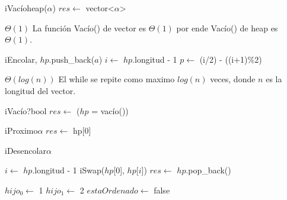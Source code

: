 \begin{Algoritmos}

  \begin{algoritmo}{iVac\'{i}o}{}{heap($\alpha$)}
    $res \gets$ vector<$\alpha$>\; 
  \end{algoritmo}
  \datosAlgoritmo{} %
  {} %
  {} %
  {$\Theta(1)$} %
  {La funci\'{o}n Vac\'{i}o() de vector es $\Theta(1)$ por ende Vac\'{i}o() de heap es $\Theta(1)$. } %

  \begin{algoritmo}{iEncolar}{, }{}
    $hp$.push\_back($a$)\; 
     $i \gets$ $hp$.longitud - 1\; 
     $p \gets$ (i/2) - ((i+1)\%2)\; 
  \end{algoritmo}
  \datosAlgoritmo{} %
  {} %
  {} %
  {$\Theta(log(n))$} %
  {El while se repite como maximo $log(n)$ veces, donde $n$ es la longitud del vector. } %

  \begin{algoritmo}{iVac\'{i}o?}{}{bool}
    $res \gets$ ($hp$ = vac\'{i}o())\; 
  \end{algoritmo}

  \begin{algoritmo}{iProximo}{}{$\alpha$}
    $res \gets$ hp[0]\; 
  \end{algoritmo}

  \begin{algoritmo}{iDesencolar}{}{$\alpha$}

     $i \gets$ $hp$.longitud - 1\;
    iSwap($hp$[$0$], $hp$[$i$])\; 
    $res \gets$ $hp$.pop\_back()\; 

     $hijo_{0} \gets$ 1\; 
     $hijo_{1} \gets$ 2\; 
     $estaOrdenado \gets$ false\; 


\end{algoritmo}
\end{Algoritmos}
